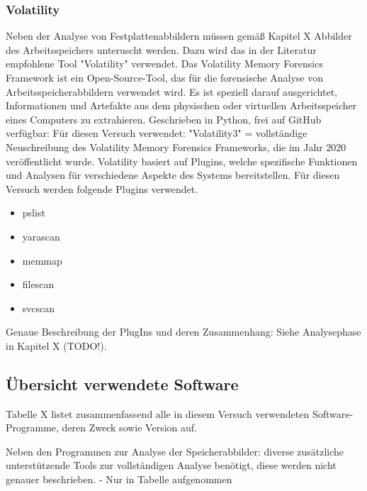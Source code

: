 \subsubsection*{Volatility}
Neben der Analyse von Festplattenabbildern müssen gemäß Kapitel X Abbilder des Arbeitsspeichers unteruscht werden. Dazu wird das in der Literatur empfohlene Tool "Volatility" verwendet.
Das Volatility Memory Forensics Framework ist ein Open-Source-Tool, das für die forensische Analyse von Arbeitsspeicherabbildern verwendet wird. Es ist speziell darauf ausgerichtet, Informationen und Artefakte aus dem physischen oder virtuellen Arbeitsspeicher eines Computers zu extrahieren.
Geschrieben in Python, frei auf GitHub verfügbar:	
Für diesen Versuch verwendet: "Volatility3"
= vollständige Neuschreibung des Volatility Memory Forensics Frameworks, die im Jahr 2020 veröffentlicht wurde. 
Volatility basiert auf Plugins, welche spezifische Funktionen und Analysen für verschiedene Aspekte des Systems bereitstellen. Für diesen Versuch werden folgende Plugins verwendet. 
\begin{itemize}
\item pslist	
\item yarascan		
\item memmap	 	
\item filescan
\item svcscan
\end{itemize}
Genaue Beschreibung der PlugIns und deren Zusammenhang: Siehe Analysephase in Kapitel X (TODO!).		


\subsection*{Übersicht verwendete Software}

Tabelle X listet zusammenfassend alle in diesem Versuch verwendeten Software-Programme, deren Zweck sowie Version auf.

Neben den Programmen zur Analyse der Speicherabbilder: diverse zusätzliche unterstützende Tools zur vollständigen Analyse benötigt, diese werden nicht genauer beschrieben.
- Nur in Tabelle aufgenommen

